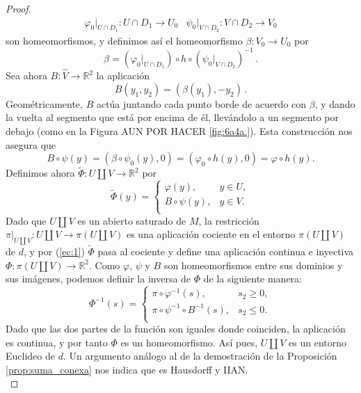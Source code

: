 \documentclass[10pt]{report}
\newcommand{\R}{\mathbb{R}}
\theoremstyle{definition}
\begin{document}
\begin{proof}
$$\begin{array}{lr}
\varphi_0|_{U\cap D_1}: U\cap D_1\to U_0  & \psi_0|_{V\cap D_2}:V\cap D_2\to V_0
\end{array}$$
son homeomorfismos, y definimos así el homeomorfismo $\beta:V_0\to U_0$ por $$\beta=(\varphi_0|_{U\cap D_1})\circ h\circ (\psi_0|_{V\cap D_2})^{-1}\, .$$ 
Sea ahora $B:\widehat{V}\to \R^2$ la aplicación $$B(y_1,y_2)=\left(\beta (y_1), -y_2\right)\, .$$
Geométricamente, $B$ actúa juntando cada punto borde de acuerdo con $\beta$, y dando la vuelta al segmento que está por encima de él, llevándolo a un segmento por debajo (como en la Figura AUN POR HACER \autoref{fig:6a4a.}). Esta construcción nos asegura que 
\begin{equation}\label{ec:1}
B\circ \psi(y)=\left(\beta \circ \psi_0(y),0\right)=\left(\varphi_0 \circ h(y),0\right)=\varphi \circ h(y).
\end{equation}
Definimos ahora $\tilde{\Phi}:U\amalg V\to \R^2$ por $$\tilde{\Phi}(y)=\begin{cases}
\varphi(y), & y\in U,\\
B\circ \psi (y), & y\in V.\\
\end{cases}$$
Dado que $U\amalg V$ es un abierto saturado de $M$, la restricción $\pi|_{U\amalg V}:U\amalg V\to \pi (U\amalg V)$ es una aplicación cociente en el entorno $\pi (U\amalg V)$ de $d$, y por (\ref{ec:1}) $\tilde{\Phi}$ pasa al cociente y define una aplicación continua e inyectiva $\Phi :\pi (U\amalg V)\to \R^2$. Como $\varphi$, $\psi$ y $B$ son homeomorfismos entre sus dominios y sus imágenes, podemos definir la inversa de $\Phi$ de la siguiente manera:
$$\Phi ^{-1}(s)= \begin{cases} 
\pi \circ \varphi ^{-1}(s), & s_2\geq 0, \\
\pi \circ \psi ^{-1} \circ B^{-1}(s), & s_2\leq 0.\\
 \end{cases}$$
Dado que las dos partes de la función son iguales donde coinciden, la aplicación es continua, y por tanto $\Phi$ es un homeomorfismo. Así pues, $U\amalg V$ es un entorno Euclideo de $d$. Un argumento análogo al de la demostración de la Proposición \ref{prop:suma_conexa} nos indica que es Hausdorff y IIAN.\\

\end{proof}
\end{document}
